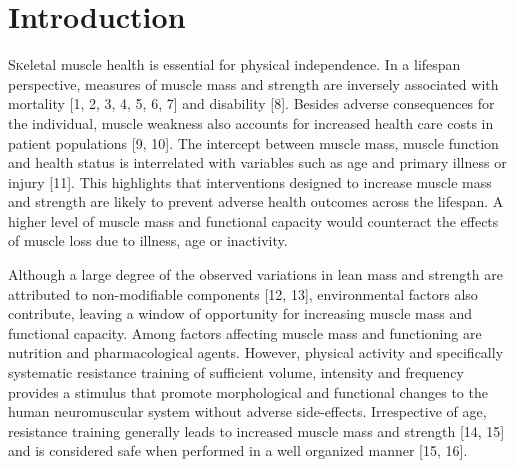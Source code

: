 \documentclass[twoside,10pt]{gihclass} %
\begin{document}
  \hypersetup{linkcolor=black}
  \setcounter{tocdepth}{2}
  \tableofcontents

  \listoftables

  \listoffigures




\mainmatter %
\pagestyle{fancyplain} %

\setcounter{DefaultLines}{3}

\hypertarget{introduction}{%
\chapter{Introduction}\label{introduction}}

\lettrine{S}keletal muscle health is essential for physical independence. In a lifespan perspective, measures of muscle mass and strength are inversely associated with mortality
{[}1, 2, 3, 4, 5, 6, 7{]}
and disability
{[}8{]}.
Besides adverse consequences for the individual, muscle weakness also accounts for increased health care costs in patient populations
{[}9, 10{]}.
The intercept between muscle mass, muscle function and health status is interrelated with variables such as age and primary illness or injury
{[}11{]}.
This highlights that interventions designed to increase muscle mass and strength are likely to prevent adverse health outcomes across the lifespan. A higher level of muscle mass and functional capacity would counteract the effects of muscle loss due to illness, age or inactivity.

Although a large degree of the observed variations in lean mass and strength are attributed to non-modifiable components
{[}12, 13{]},
environmental factors also contribute, leaving a window of opportunity for increasing muscle mass and functional capacity. Among factors affecting muscle mass and functioning are nutrition and pharmacological agents. However, physical activity and specifically systematic resistance training of sufficient volume, intensity and frequency provides a stimulus that promote morphological and functional changes to the human neuromuscular system without adverse side-effects. Irrespective of age, resistance training generally leads to increased muscle mass and strength
{[}14, 15{]}
and is considered safe when performed in a well organized manner
{[}15, 16{]}.
\end{document}
